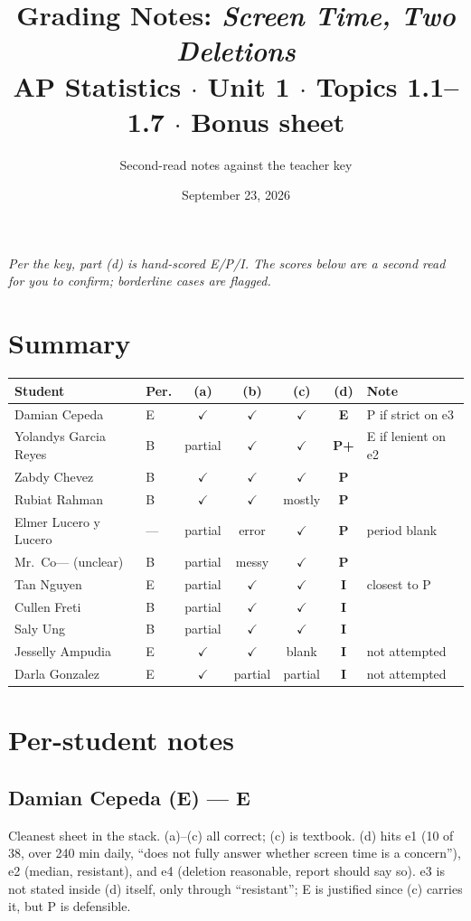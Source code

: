 \documentclass[11pt,letterpaper]{article}
\title{\vspace{-2em}Grading Notes: \emph{Screen Time, Two Deletions}\\
\large AP Statistics $\cdot$ Unit 1 $\cdot$ Topics 1.1--1.7 $\cdot$ Bonus sheet}
\author{Second-read notes against the teacher key}
\date{September 23, 2026}
\newcommand{\ok}{$\checkmark$}
\newcommand{\score}[1]{\textbf{#1}}
\begin{document}
\maketitle
\vspace{-2em}

\noindent\emph{Per the key, part (d) is hand-scored E/P/I. The scores below are a second read for you to confirm; borderline cases are flagged.}

\section{Summary}

\begin{center}
\begin{tabular}{@{}llccccl@{}}
\toprule
Student & Per. & (a) & (b) & (c) & (d) & Note \\
\midrule
Damian Cepeda        & E & \ok & \ok & \ok & \score{E} & P if strict on e3 \\
Yolandys Garcia Reyes& B & partial & \ok & \ok & \score{P+} & E if lenient on e2 \\
Zabdy Chevez         & B & \ok & \ok & \ok & \score{P} & \\
Rubiat Rahman        & B & \ok & \ok & mostly & \score{P} & \\
Elmer Lucero y Lucero& --- & partial & error & \ok & \score{P} & period blank \\
Mr.\ Co--- (unclear)  & B & partial & messy & \ok & \score{P} & \\
Tan Nguyen           & E & partial & \ok & \ok & \score{I} & closest to P \\
Cullen Freti         & B & partial & \ok & \ok & \score{I} & \\
Saly Ung             & B & partial & \ok & \ok & \score{I} & \\
Jesselly Ampudia     & E & \ok & \ok & blank & \score{I} & not attempted \\
Darla Gonzalez       & E & \ok & partial & partial & \score{I} & not attempted \\
\bottomrule
\end{tabular}
\end{center}

\section{Per-student notes}

\subsection{Damian Cepeda (E) --- \score{E}}
Cleanest sheet in the stack. (a)--(c) all correct; (c) is textbook. (d) hits e1 (10 of 38, over 240 min daily, ``does not fully answer whether screen time is a concern''), e2 (median, resistant), and e4 (deletion reasonable, report should say so). e3 is not stated inside (d) itself, only through ``resistant''; E is justified since (c) carries it, but P is defensible.
\end{document}
